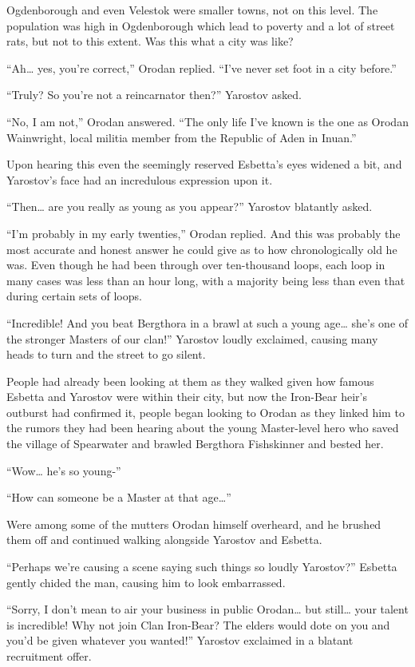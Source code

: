 \documentclass[a4paper,10pt]{book}
\begin{document}
Ogdenborough and even Velestok were smaller towns, not on this level. The population was high in Ogdenborough which lead to poverty and a lot of street rats, but not to this extent. Was this what a city was like?\par
“Ah… yes, you’re correct,” Orodan replied. “I’ve never set foot in a city before.”\par
“Truly? So you’re not a reincarnator then?” Yarostov asked.\par
“No, I am not,” Orodan answered. “The only life I’ve known is the one as Orodan Wainwright, local militia member from the Republic of Aden in Inuan.”\par
Upon hearing this even the seemingly reserved Esbetta’s eyes widened a bit, and Yarostov’s face had an incredulous expression upon it.\par
“Then… are you really as young as you appear?” Yarostov blatantly asked.\par
“I’m probably in my early twenties,” Orodan replied. And this was probably the most accurate and honest answer he could give as to how chronologically old he was. Even though he had been through over ten-thousand loops, each loop in many cases was less than an hour long, with a majority being less than even that during certain sets of loops.\par
“Incredible! And you beat Bergthora in a brawl at such a young age… she’s one of the stronger Masters of our clan!” Yarostov loudly exclaimed, causing many heads to turn and the street to go silent.\par
People had already been looking at them as they walked given how famous Esbetta and Yarostov were within their city, but now the Iron-Bear heir’s outburst had confirmed it, people began looking to Orodan as they linked him to the rumors they had been hearing about the young Master-level hero who saved the village of Spearwater and brawled Bergthora Fishskinner and bested her.\par
“Wow… he’s so young-”\par
“How can someone be a Master at that age…”\par
Were among some of the mutters Orodan himself overheard, and he brushed them off and continued walking alongside Yarostov and Esbetta.\par
“Perhaps we’re causing a scene saying such things so loudly Yarostov?” Esbetta gently chided the man, causing him to look embarrassed.\par
“Sorry, I don’t mean to air your business in public Orodan… but still… your talent is incredible! Why not join Clan Iron-Bear? The elders would dote on you and you’d be given whatever you wanted!” Yarostov exclaimed in a blatant recruitment offer.\par
\end{document}
